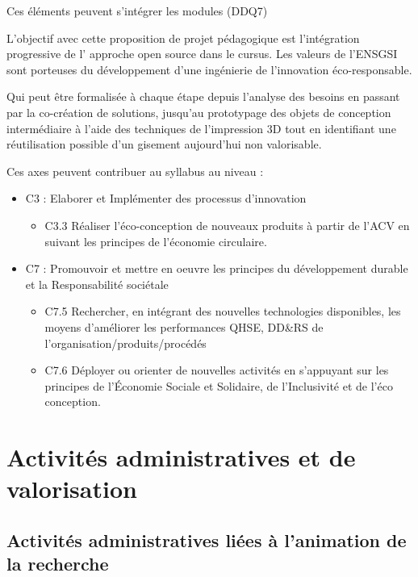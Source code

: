 \documentclass[
  11pt,
]{article}
\providecommand{\tightlist}{%
  \setlength{\itemsep}{0pt}\setlength{\parskip}{0pt}}\usepackage{longtable,booktabs,array}
\begin{document}
Ces éléments peuvent s'intégrer les modules (DDQ7)

L'objectif avec cette proposition de projet pédagogique est
l'intégration progressive de l' approche open source dans le cursus. Les
valeurs de l'ENSGSI sont porteuses du développement d'une ingénierie de
l'innovation éco-responsable.

Qui peut être formalisée à chaque étape depuis l'analyse des besoins en
passant par la co-création de solutions, jusqu'au prototypage des objets
de conception intermédiaire à l'aide des techniques de l'impression 3D
tout en identifiant une réutilisation possible d'un gisement aujourd'hui
non valorisable.

Ces axes peuvent contribuer au syllabus au niveau :

\begin{itemize}
\item
  C3 : Elaborer et Implémenter des processus d'innovation

  \begin{itemize}
  \tightlist
  \item
    C3.3 Réaliser l'éco-conception de nouveaux produits à partir de
    l'ACV en suivant les principes de l'économie circulaire.
  \end{itemize}
\item
  C7 : Promouvoir et mettre en oeuvre les principes du développement
  durable et la Responsabilité sociétale

  \begin{itemize}
  \item
    C7.5 Rechercher, en intégrant des nouvelles technologies
    disponibles, les moyens d'améliorer les performances QHSE, DD\&RS de
    l'organisation/produits/procédés
  \item
    C7.6 Déployer ou orienter de nouvelles activités en s'appuyant sur
    les principes de l'Économie Sociale et Solidaire, de l'Inclusivité
    et de l'éco conception.
  \end{itemize}
\end{itemize}

\hypertarget{activituxe9s-administratives-et-de-valorisation}{%
\section{Activités administratives et de
valorisation}\label{activituxe9s-administratives-et-de-valorisation}}

\hypertarget{activituxe9s-administratives-liuxe9es-uxe0-lanimation-de-la-recherche}{%
\subsection{Activités administratives liées à l'animation de la
recherche}\label{activituxe9s-administratives-liuxe9es-uxe0-lanimation-de-la-recherche}}
\end{document}
